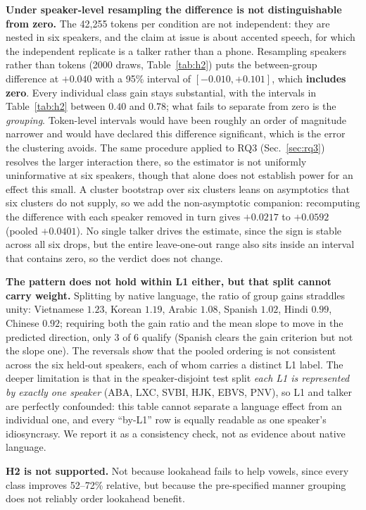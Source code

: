 \documentclass[journal]{IEEEtran}
\begin{document}
\textbf{Under speaker-level resampling the difference is not distinguishable
from zero.} The 42{,}255 tokens per condition are not independent: they are
nested in six speakers, and the claim at issue is about accented speech, for
which the independent replicate is a talker rather than a phone. Resampling
speakers rather than tokens (2000 draws, Table~\ref{tab:h2}) puts the
between-group difference at $+0.040$ with a 95\% interval of
$[-0.010, +0.101]$, which \textbf{includes zero}. Every individual class gain
stays substantial, with the intervals in Table~\ref{tab:h2} between $0.40$ and
$0.78$; what fails to separate from zero is the \emph{grouping}. Token-level intervals
would have been roughly an order of magnitude narrower and would have declared
this difference significant, which is the error the clustering avoids. The same
procedure applied to RQ3 (Sec.~\ref{sec:rq3}) resolves the larger interaction
there, so the estimator is not uniformly uninformative at six speakers, though
that alone does not establish power for an effect this small.
A cluster bootstrap over six clusters leans on asymptotics that six clusters do
not supply, so we add the non-asymptotic companion: recomputing the difference
with each speaker removed in turn gives $+0.0217$ to $+0.0592$ (pooled
$+0.0401$). No single talker drives the estimate, since the sign is stable
across all six drops, but the entire leave-one-out range also sits inside an
interval that contains zero, so the verdict does not change.

\textbf{The pattern does not hold within L1 either, but that split cannot carry
weight.} Splitting by native language, the ratio of group gains straddles
unity: Vietnamese $1.23$, Korean $1.19$, Arabic $1.08$, Spanish $1.02$,
Hindi $0.99$, Chinese $0.92$; requiring both the gain ratio and the mean slope
to move in the predicted direction, only 3 of 6 qualify (Spanish clears the
gain criterion but not the slope one). The reversals show that the pooled
ordering is not consistent across the six held-out speakers, each of whom
carries a distinct L1 label.
The deeper limitation is that in the speaker-disjoint test split \emph{each L1
is represented by exactly one speaker} (ABA, LXC, SVBI, HJK, EBVS, PNV), so L1
and talker are perfectly confounded: this table cannot separate a language
effect from an individual one, and every ``by-L1'' row is equally readable as one
speaker's idiosyncrasy. We report it as a consistency check, not as evidence
about native language.

\textbf{H2 is not supported.} Not because lookahead fails to help vowels, since
every class improves 52--72\% relative, but because the pre-specified manner
grouping does not reliably order lookahead benefit.
\end{document}
